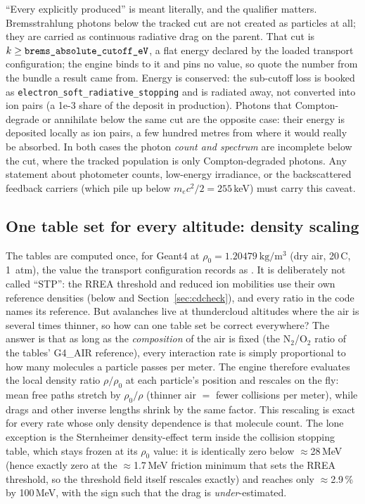 \documentclass[11pt]{article}
\DeclareRobustCommand{\code}[1]{\ifmmode\text{\ttfamily#1}\else\nolinkurl{#1}\fi}
\begin{document}
``Every explicitly produced'' is meant literally, and the qualifier matters.
Bremsstrahlung photons below the tracked cut are not created as particles at
all; they are carried as continuous radiative drag on the parent. That cut is
$k \geq \code{brems\_absolute\_cutoff\_eV}$, a flat energy declared by the
loaded transport configuration; the engine binds to it and pins no value, so quote the
number from the bundle a result came from. Energy is conserved: the sub-cutoff loss is
booked as \code{electron\_soft\_radiative\_stopping} and is radiated away, not
converted into ion pairs (a 1e-3 share of the deposit in production). Photons
that Compton-degrade or annihilate below the same cut are the opposite case:
their energy is deposited locally as ion pairs, a few hundred metres from
where it would really be absorbed. In both cases the photon \emph{count and
spectrum} are incomplete below the cut, where the tracked population is only
Compton-degraded photons. Any statement about photometer counts, low-energy
irradiance, or the backscattered feedback carriers (which pile up below
$m_ec^2/2 = 255$\,keV) must carry this caveat.

\subsection{One table set for every altitude: density scaling}
\label{sec:density}

The tables are computed once, for Geant4  at
$\rho_0=1.20479~\mathrm{kg/m^3}$ (dry air, 20\,\textdegree C, 1~atm), the
value the transport configuration records as .
It is deliberately not called ``STP'': the RREA threshold and reduced ion
mobilities use their own reference densities (below and
Section~\ref{sec:cdcheck}), and every ratio in the code names its reference.
But avalanches live at thundercloud altitudes where the air is
several times thinner, so how can one table set be correct everywhere?
The answer is that as long as the \emph{composition} of the air is fixed
(the N$_2$/O$_2$ ratio of the tables' G4\_AIR reference), every interaction rate is
simply proportional to how many molecules a particle passes per meter.
The engine therefore evaluates the local density ratio
$\rho/\rho_0$ at each particle's position and rescales on the fly: mean
free paths stretch by $\rho_0/\rho$ (thinner air $=$ fewer collisions per
meter), while drags and other inverse lengths shrink by the same factor.
This rescaling is exact for every rate whose only density dependence is
that molecule count. The lone exception is the Sternheimer
density-effect term inside the collision stopping table, which stays
frozen at its $\rho_0$ value: it is identically zero below
$\approx$28\,MeV (hence exactly zero at the $\approx$1.7\,MeV
friction minimum that sets the RREA threshold, so the threshold field
itself rescales exactly) and reaches only $\approx$2.9\,\% by
100\,MeV, with the sign such that the drag is \emph{under}-estimated.
\end{document}

